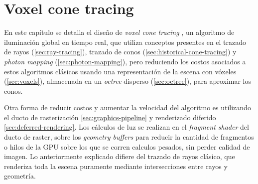 


\graphicspath{{chapters/3_diseño/figures/}}

\chapter{Voxel cone tracing}\label{chap:design}

En este capítulo se detalla el diseño de \textit{voxel cone tracing} \cite{voxel-cone-tracing}, un algoritmo de iluminación global en tiempo real, que utiliza conceptos presentes en el trazado de rayos (\ref{sec:ray-tracing}), trazado de conos (\ref{sec:historical-cone-tracing}) y \textit{photon mapping} (\ref{sec:photon-mapping}), 
pero reduciendo los costos asociados a estos algoritmos clásicos usando una representación de la escena con vóxeles (\ref{sec:voxels}), almacenada en un \textit{octree} disperso (\ref{sec:octree}), para aproximar los conos.

Otra forma de reducir costos y aumentar la velocidad del algoritmo es utilizando el ducto de rasterización \ref{sec:graphics-pipeline} y renderizado diferido \ref{sec:deferred-rendering}.
Los cálculos de luz se realizan en el \textit{fragment shader} del ducto de raster, sobre los \textit{geometry buffers} para reducir la cantidad de fragmentos o hilos de la GPU sobre los que se corren calculos pesados, sin perder calidad de imagen.
Lo anteriormente explicado difiere del trazado de rayos clásico, que renderiza toda la escena puramente mediante intersecciones entre rayos y geometría.

